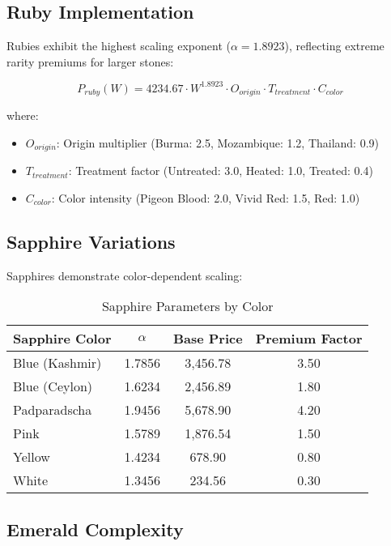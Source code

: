 \subsection{Ruby Implementation}

Rubies exhibit the highest scaling exponent ($\alpha = 1.8923$), reflecting extreme rarity premiums for larger stones:

\begin{equation}
P_{ruby}(W) = 4234.67 \cdot W^{1.8923} \cdot O_{origin} \cdot T_{treatment} \cdot C_{color}
\end{equation}

where:
\begin{itemize}
\item $O_{origin}$: Origin multiplier (Burma: 2.5, Mozambique: 1.2, Thailand: 0.9)
\item $T_{treatment}$: Treatment factor (Untreated: 3.0, Heated: 1.0, Treated: 0.4)
\item $C_{color}$: Color intensity (Pigeon Blood: 2.0, Vivid Red: 1.5, Red: 1.0)
\end{itemize}

\subsection{Sapphire Variations}

Sapphires demonstrate color-dependent scaling:

\begin{table}[H]
\centering
\caption{Sapphire Parameters by Color}
\begin{tabular}{lccc}
\toprule
\textbf{Sapphire Color} & \textbf{$\alpha$} & \textbf{Base Price} & \textbf{Premium Factor} \\
\midrule
Blue (Kashmir) & 1.7856 & 3,456.78 & 3.50 \\
Blue (Ceylon) & 1.6234 & 2,456.89 & 1.80 \\
Padparadscha & 1.9456 & 5,678.90 & 4.20 \\
Pink & 1.5789 & 1,876.54 & 1.50 \\
Yellow & 1.4234 & 678.90 & 0.80 \\
White & 1.3456 & 234.56 & 0.30 \\
\bottomrule
\end{tabular}
\end{table}

\subsection{Emerald Complexity}

